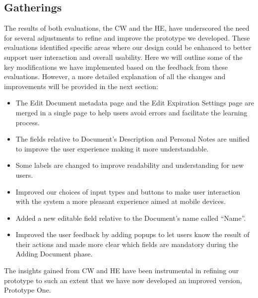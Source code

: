 \subsection{Gatherings}
The results of both evaluations, the CW and the HE, have underscored the need for several adjustments to refine and improve the prototype we developed. These evaluations identified specific areas where our design could be enhanced to better support user interaction and overall usability.\newline\newline
Here we will outline some of the key modifications we have implemented based on the feedback from these evaluations. However, a more detailed explanation of all the changes and improvements will be provided in the next section: 
\begin{itemize}
	\item The Edit Document metadata page and the Edit Expiration Settings page are merged in a single page to help users avoid errors and facilitate the learning process.
	\item The fields relative to Document’s Description and Personal Notes are unified to improve the user experience making it more understandable.
	\item Some labels are changed to improve readability and understanding for new users.
	\item Improved our choices of input types and buttons to make user interaction with the system a more pleasant experience aimed at mobile devices.
	\item Added a new editable field relative to the Document’s name called “Name”.
	\item Improved the user feedback by  adding popups to let users know the result of their actions and made more clear which fields are mandatory during the Adding Document phase. 
	
\end{itemize}
The insights gained from CW and HE have been instrumental in refining our prototype to such an extent that we have now developed an improved version, Prototype One.